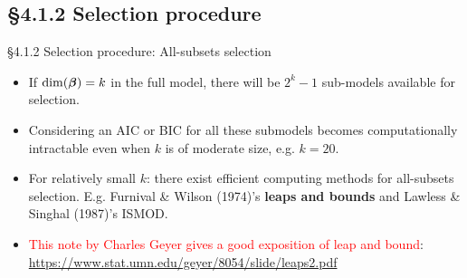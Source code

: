 \documentclass{beamer}
\newcommand{\currentsubsection}{}
\let\oldsubsection\subsection
\renewcommand{\subsection}[1]{\oldsubsection{#1}\renewcommand{\currentsubsection}{#1}}
\begin{document}
%
%
%
%

\subsection{\S4.1.2 Selection procedure}
\begin{frame}{\S4.1.2 Selection procedure: All-subsets selection }
\begin{itemize}
\item
If $\dim(\mbox{\boldmath $\beta$})=k$ in the full model, there will be  $2^k-1$
sub-models available for selection.
\item
Considering an AIC or BIC  for all these submodels becomes computationally intractable even when $k$ is of moderate size, e.g. $k=20$.
\item
For relatively small $k$:  there exist efficient computing methods for all-subsets selection. E.g.
Furnival \& Wilson (1974)'s \textbf{leaps and bounds} and Lawless \& Singhal (1987)'s ISMOD.

\item \textcolor{red}{This note by  Charles Geyer gives a good exposition of leap and bound}: 
\href{https://www.stat.umn.edu/geyer/8054/slide/leaps2.pdf}{https://www.stat.umn.edu/geyer/8054/slide/leaps2.pdf}
\end{itemize}
\end{frame}
\end{document}
